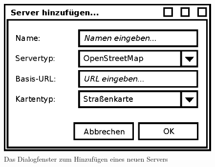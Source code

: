\documentclass[10pt]{scrreprt}
\begin{document}
\begin{figure}
	\centering
	\includegraphics[scale=0.9]{GUI-ServerDialog.eps}
	\caption{Das Dialogfenster zum Hinzufügen eines neuen Servers}
\end{figure}
\end{document}
